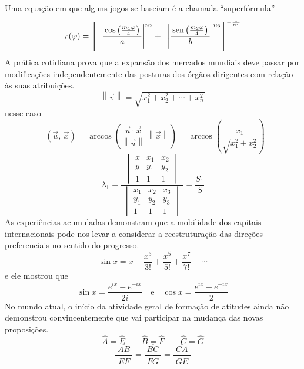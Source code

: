 \documentclass[fleqn]{profmat-cefet}
\DeclareMathOperator{\angulo}{\hat{a}ngulo}
\begin{document}
Uma equação em que alguns jogos se baseiam é a chamada ``superfórmula''
\[
    r( \varphi )= 
    \left [\, 
        \vphantom{\begin{array}{c}1\\2\\3\\\end{array}}
        \left| 
            \frac{\,\cos\left( \frac{m_1\varphi }{4} \right)\,}{a} 
        \right|^{n_2} + \;\;
        \left| 
            \frac{\,\sin\left( \frac{m_2\varphi }{4} \right)\,}{b} 
        \right|^{n_3} 
    \right]^{-\frac{1}{n_1}}
\]
A prática cotidiana prova que a expansão dos mercados
mundiais deve passar por modificações independentemente das posturas dos órgãos
dirigentes com relação às suas atribuições. 
\[
    \left\| \vec{v} \right\| = \sqrt{ x_{1}^{2} + x_{2}^{2} + \cdots + x_{n}^{2} \,}
\]
nesse caso
\[
        \angulo(\vec{u},\,\vec{x}) 
        = \arccos\left( \frac{\vec{u}\cdot \vec{x}}{\left\|\vec{u}\right\| } \, \left\|{\vec{x}}\right\| \right) 
        = \arccos\left(\frac{x_1}{\sqrt{x_{1}^{2}+x_{2}^{2}}}\right)
\]
\[
    \lambda_1 = \frac
    {
        \begin{vmatrix}
                x & x_1 & x_2 \\
                y & y_1 & y_2 \\
                1 & 1   & 1
        \end{vmatrix}
    }
    {\;
        \begin{vmatrix}
                x_1 & x_2 & x_3 \\
                y_1 & y_2 & y_3 \\
                1   & 1   & 1
        \end{vmatrix}
      \;
    }
    = \frac{S_1}{S}
\]
As experiências acumuladas
demonstram que a mobilidade dos capitais internacionais pode nos levar a
considerar a reestruturação das direções preferenciais no sentido do progresso. 
\[ 
    \sin x = x - \frac{x^{3}}{3!} + \frac{x^{5}}{5!} + \frac{x^{7}}{7!} + \cdots 
\]  
e ele mostrou que
\[ 
    \sin x = \frac{e^{ix}-e^{-ix}}{2i} \quad \text{e} \quad \cos x = \frac {e^{ix} + e^{-ix}}{2}
\] 
No mundo atual, o início da atividade geral de formação de atitudes ainda não
demonstrou convincentemente que vai participar na mudança das novas proposições.
\[ 
    \hat{A} = \hat{E} \qquad  \hat{B} = \hat{F} \qquad \hat{C} = \hat{G} 
\]  
\[
    \frac{\;\overline{AB}\;}{\;\overline{EF}\;} 
        = \frac{\;\overline{BC}\;}{\;\overline{FG}\;} 
        = \frac{\;\overline{CA}\;}{\;\overline{GE}\;} 
\]
\end{document}
